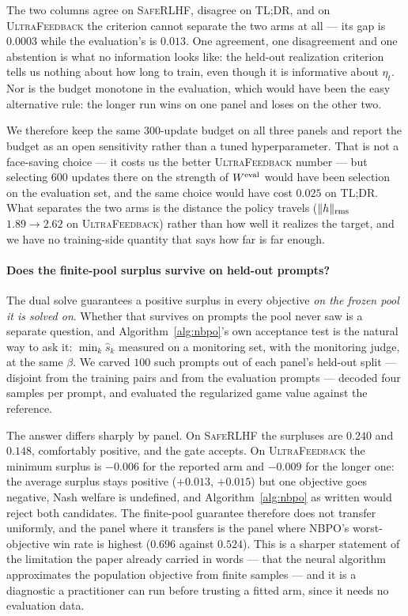 \documentclass{article}
\theoremstyle{remark}
\theoremstyle{plain}
\newcommand{\NBPO}{\textsc{NBPO}}
\begin{document}
The two columns agree on \textsc{SafeRLHF}, disagree on \textsc{TL;DR}, and on
\textsc{UltraFeedback} the criterion cannot separate the two arms at all --- its gap is $0.0003$
while the evaluation's is $0.013$. One agreement, one disagreement and one abstention is what no
information looks like: the held-out realization criterion tells us nothing about how long to train,
even though it is informative about $\eta_t$. Nor is the budget monotone in the evaluation, which
would have been the easy alternative rule: the longer run wins on one panel and loses on the other
two.

We therefore keep the same $300$-update budget on all three panels and report the budget as an open
sensitivity rather than a tuned hyperparameter. That is not a face-saving choice --- it costs us the
better \textsc{UltraFeedback} number --- but selecting $600$ updates there on the strength of
$W^{\rm eval}$ would have been selection on the evaluation set, and the same choice would have cost
$0.025$ on \textsc{TL;DR}. What separates the two arms is the distance the policy travels
($\|h\|_{\rm rms}$ $1.89\to2.62$ on \textsc{UltraFeedback}) rather than how well it realizes the
target, and we have no training-side quantity that says how far is far enough.

\paragraph{Does the finite-pool surplus survive on held-out prompts?}
The dual solve guarantees a positive surplus in every objective \emph{on the frozen pool it is
solved on}. Whether that survives on prompts the pool never saw is a separate question, and
Algorithm~\ref{alg:nbpo}'s own acceptance test is the natural way to ask it: $\min_k \hat s_k$
measured on a monitoring set, with the monitoring judge, at the same $\beta$. We carved $100$ such
prompts out of each panel's held-out split --- disjoint from the training pairs and from the
evaluation prompts --- decoded four samples per prompt, and evaluated the regularized game value
against the reference.

The answer differs sharply by panel. On \textsc{SafeRLHF} the surpluses are $0.240$ and $0.148$,
comfortably positive, and the gate accepts. On \textsc{UltraFeedback} the minimum surplus is
$-0.006$ for the reported arm and $-0.009$ for the longer one: the average surplus stays positive
($+0.013$, $+0.015$) but one objective goes negative, Nash welfare is undefined, and
Algorithm~\ref{alg:nbpo} as written would reject both candidates. The finite-pool guarantee
therefore does not transfer uniformly, and the panel where it transfers is the panel where
\NBPO{}'s worst-objective win rate is highest ($0.696$ against $0.524$). This is a sharper statement
of the limitation the paper already carried in words --- that the neural algorithm approximates the
population objective from finite samples --- and it is a diagnostic a practitioner can run before
trusting a fitted arm, since it needs no evaluation data.
\end{document}
